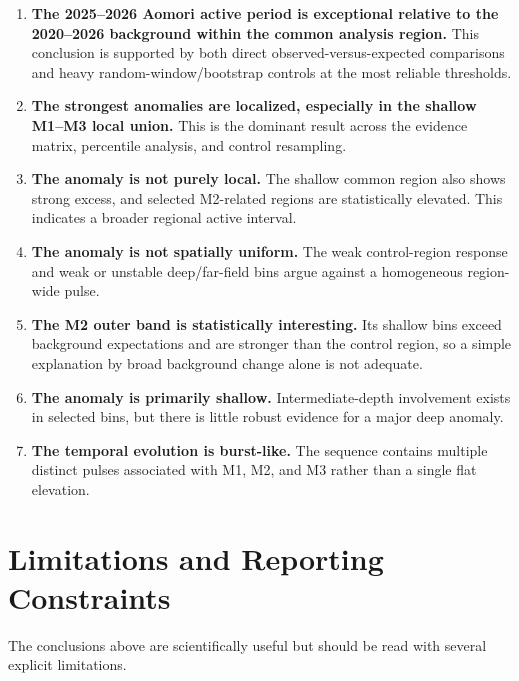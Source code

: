 \documentclass[11pt]{article}
\begin{document}
\begin{enumerate}[leftmargin=1.5em]
    \item \textbf{The 2025--2026 Aomori active period is exceptional relative to the 2020--2026 background within the common analysis region.} This conclusion is supported by both direct observed-versus-expected comparisons and heavy random-window/bootstrap controls at the most reliable thresholds.
    \item \textbf{The strongest anomalies are localized, especially in the shallow M1--M3 local union.} This is the dominant result across the evidence matrix, percentile analysis, and control resampling.
    \item \textbf{The anomaly is not purely local.} The shallow common region also shows strong excess, and selected M2-related regions are statistically elevated. This indicates a broader regional active interval.
    \item \textbf{The anomaly is not spatially uniform.} The weak control-region response and weak or unstable deep/far-field bins argue against a homogeneous region-wide pulse.
    \item \textbf{The M2 outer band is statistically interesting.} Its shallow bins exceed background expectations and are stronger than the control region, so a simple explanation by broad background change alone is not adequate.
    \item \textbf{The anomaly is primarily shallow.} Intermediate-depth involvement exists in selected bins, but there is little robust evidence for a major deep anomaly.
    \item \textbf{The temporal evolution is burst-like.} The sequence contains multiple distinct pulses associated with M1, M2, and M3 rather than a single flat elevation.
\end{enumerate}

\section{Limitations and Reporting Constraints}
The conclusions above are scientifically useful but should be read with several explicit limitations.
\end{document}
